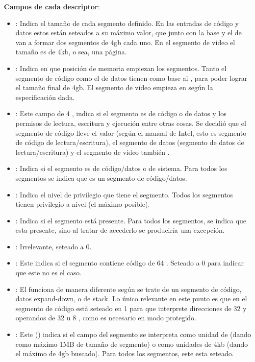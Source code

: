 \noindent \textbf{Campos de cada descriptor}:
\begin{itemize}
	\item{}: Indica el tamaño de cada segmento definido. En las entradas de código y datos estos  están seteados a su máximo valor, 
que junto con la base y el  de  van a formar dos segmentos de 4gb cada uno. En el segmento de video el tamaño es de 4kb, 
o sea, una página.
	\item{}: Indica en que posición de memoria empiezan los segmentos. Tanto el segmento de código como el de datos tienen como base al 
, para poder lograr el tamaño final de 4gb. El segmento de vídeo empieza en  según la especificación dada.
	\item{}: Este campo de 4 , indica si el segmento es de código o de datos y los permisos de lectura, escritura y ejecución 
entre otras cosas. Se decidió que el segmento de código lleve el valor  (según el manual de Intel, esto es segmento de código de lectura/escritura), 
el segmento de datos  (segmento de datos de lectura/escritura) y el segmento de video también .
	\item{}: Indica si el segmento es de código/datos o de sistema. Para todos los segmentos se indica que es un segmento de código/datos.
	\item{}: Indica el nivel de privilegio que tiene el segmento. Todos los segmentos tienen privilegio a nivel  (el máximo posible).
	\item{}: Indica si el segmento está presente. Para todos los segmentos, se indica que esta presente, sino al tratar de accederlo se 
produciría una excepción.
	\item{}: Irrelevante, seteado a 0.
	\item{}: Este  indica si el segmento contiene código de 64 . Seteado a 0 para indicar que este no es el caso.
	\item{}: El  funciona de manera diferente según se trate de un segmento de código, datos expand-down, o de stack. 
Lo único relevante en este punto es que en el segmento de código está seteado en 1 para que interprete direcciones de 32  y operandos de 32 u 8 , como es necesario en modo protegido.
	\item{}: Este  () indica si el campo  del segmento se interpreta como unidad de  (dando como máximo 1MB de tamaño de segmento) o como unidades de 4kb (dando el máximo de 4gb buscado). Para todos los segmentos, este  esta seteado.
\end{itemize}

